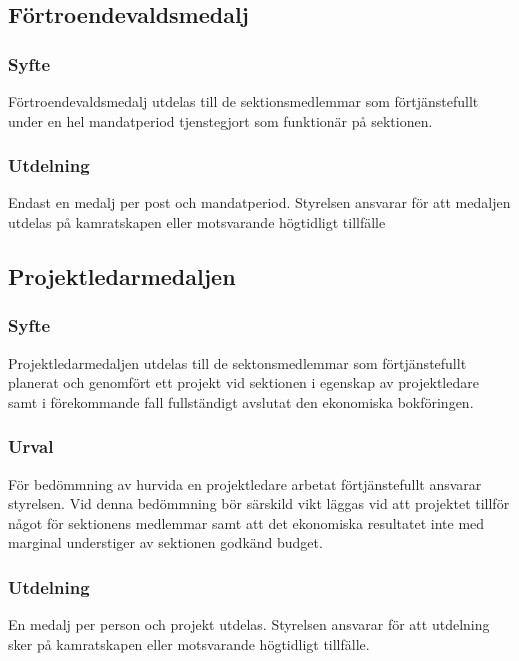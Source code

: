 \documentclass{../resources/dgovdoc}
\begin{document}
\subsection{Förtroendevaldsmedalj}

\subsubsection{Syfte}

Förtroendevaldsmedalj utdelas till de sektionsmedlemmar som förtjänstefullt under en hel mandatperiod tjenstegjort som funktionär på sektionen. 

\subsubsection{Utdelning}

Endast en medalj per post och mandatperiod. Styrelsen ansvarar för att medaljen utdelas på kamratskapen eller motsvarande högtidligt tillfälle

\subsection{Projektledarmedaljen}

\subsubsection{Syfte}

Projektledarmedaljen utdelas till de sektonsmedlemmar som förtjänstefullt planerat och genomfört ett projekt vid sektionen i egenskap av projektledare samt i förekommande fall fullständigt avslutat den ekonomiska bokföringen. 

\subsubsection{Urval}

För bedömmning av hurvida en projektledare arbetat förtjänstefullt ansvarar styrelsen. Vid denna bedömmning bör särskild vikt läggas vid att projektet tillför något för sektionens medlemmar samt att det ekonomiska resultatet inte med marginal understiger av sektionen godkänd budget. 

\subsubsection{Utdelning}

En medalj per person och projekt utdelas. Styrelsen ansvarar för att utdelning sker på kamratskapen eller motsvarande högtidligt tillfälle.
\end{document}
